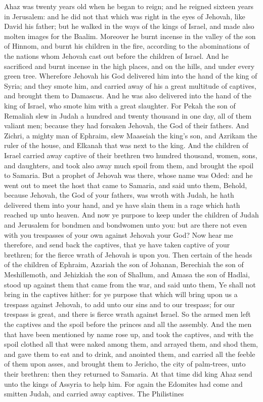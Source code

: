 Ahaz was twenty years old when he began to reign; and he reigned sixteen years in Jerusalem: and he did not that which was right in the eyes of Jehovah, like David his father; but he walked in the ways of the kings of Israel, and made also molten images for the Baalim. Moreover he burnt incense in the valley of the son of Hinnom, and burnt his children in the fire, according to the abominations of the nations whom Jehovah cast out before the children of Israel. And he sacrificed and burnt incense in the high places, and on the hills, and under every green tree.  Wherefore Jehovah his God delivered him into the hand of the king of Syria; and they smote him, and carried away of his a great multitude of captives, and brought them to Damascus. And he was also delivered into the hand of the king of Israel, who smote him with a great slaughter. For Pekah the son of Remaliah slew in Judah a hundred and twenty thousand in one day, all of them valiant men; because they had forsaken Jehovah, the God of their fathers. And Zichri, a mighty man of Ephraim, slew Maaseiah the king’s son, and Azrikam the ruler of the house, and Elkanah that was next to the king.  And the children of Israel carried away captive of their brethren two hundred thousand, women, sons, and daughters, and took also away much spoil from them, and brought the spoil to Samaria. But a prophet of Jehovah was there, whose name was Oded: and he went out to meet the host that came to Samaria, and said unto them, Behold, because Jehovah, the God of your fathers, was wroth with Judah, he hath delivered them into your hand, and ye have slain them in a rage which hath reached up unto heaven. And now ye purpose to keep under the children of Judah and Jerusalem for bondmen and bondwomen unto you: but are there not even with you trespasses of your own against Jehovah your God? Now hear me therefore, and send back the captives, that ye have taken captive of your brethren; for the fierce wrath of Jehovah is upon you. Then certain of the heads of the children of Ephraim, Azariah the son of Johanan, Berechiah the son of Meshillemoth, and Jehizkiah the son of Shallum, and Amasa the son of Hadlai, stood up against them that came from the war, and said unto them, Ye shall not bring in the captives hither: for ye purpose that which will bring upon us a trespass against Jehovah, to add unto our sins and to our trespass; for our trespass is great, and there is fierce wrath against Israel. So the armed men left the captives and the spoil before the princes and all the assembly. And the men that have been mentioned by name rose up, and took the captives, and with the spoil clothed all that were naked among them, and arrayed them, and shod them, and gave them to eat and to drink, and anointed them, and carried all the feeble of them upon asses, and brought them to Jericho, the city of palm-trees, unto their brethren: then they returned to Samaria.  At that time did king Ahaz send unto the kings of Assyria to help him. For again the Edomites had come and smitten Judah, and carried away captives. The Philistines 